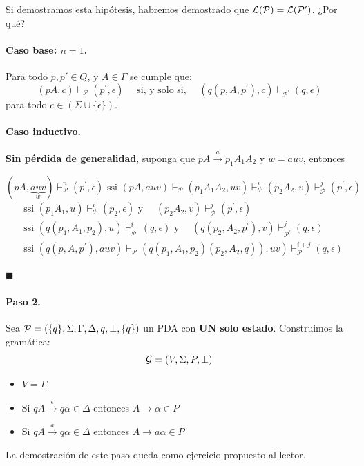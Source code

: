 Si demostramos esta hipótesis, habremos demostrado que $\mathcal{L}(\mathcal{P}) = \mathcal{L}(\mathcal{P'})$. ¿Por qué?

\paragraph{Caso base: $n=1$.} Para todo $p,p' \in Q$, y $A \in \Gamma$ se cumple que:
$$
    (p A, c) \vdash_\mathcal{P}\left(p^{\prime}, \epsilon\right) \quad \text { si, y solo si, } \quad\left(q\left(p, A, p^{\prime}\right), c\right) \vdash_{\mathcal{P}^{\prime}}(q, \epsilon)
$$
para todo $c \in (\Sigma \cup \{\epsilon\})$.

\paragraph{Caso inductivo.} \textbf{Sin pérdida de generalidad}, suponga que $pA \overset{a}{\to} p_1A_1A_2$ y $w=auv$, entonces

$$
    (p A, \underbrace{a u v}_w) \vdash_{\mathcal{P}}^n\left(p^{\prime}, \epsilon\right) \text { ssi }(p A, a u v) \vdash_{\mathcal{P}}\left(p_1 A_1 A_2, u v\right) \vdash_{\mathcal{P}}^i\left(p_2 A_2, v\right) \vdash_{\mathcal{P}}^j\left(p^{\prime}, \epsilon\right)
$$
\begin{align*}
     & \text{ssi }  \left(p_1 A_1, u\right) \vdash_{\mathcal{P}}^i\left(p_2, \epsilon\right) \text { y } \quad\left(p_2 A_2, v\right) \vdash_{\mathcal{P}}^j\left(p^{\prime}, \epsilon\right)                                  \\
     & \text {ssi }  \left(q\left(p_1, A_1, p_2\right), u\right) \vdash_{\mathcal{P}^{\prime}}^i(q, \epsilon) \text { y } \quad\left(q\left(p_2, A_2, p^{\prime}\right), v\right) \vdash_{\mathcal{P}^{\prime}}^j(q, \epsilon) \\
     & \text {ssi }  \left.\left(q\left(p, A, p^{\prime}\right), auv\right) \vdash_{\mathcal{P}}\left(q\left(p_1, A_1, p_2\right)\left(p_2, A_2, q\right)\right), u v\right) \vdash_{\mathcal{P}}^{i+j}(q, \epsilon)
\end{align*}

\hfill $\blacksquare$

\paragraph{Paso 2.} Sea $\mathcal{P}=(\{q\},\Sigma,\Gamma,\Delta,q,\bot,\{q\})$ un PDA con \textbf{UN solo estado}. Construimos la gramática:
$$
    \mathcal{G} = (V, \Sigma, P, \bot)
$$
\begin{itemize}
    \item $V=\Gamma$.
    \item Si $qA \overset{\epsilon}{\to} q\alpha \in \Delta$ entonces $A \to \alpha \in P$
    \item Si $qA \overset{a}{\to} q\alpha \in \Delta$ entonces $A \to a\alpha \in P$
\end{itemize}
La demostración de este paso queda como ejercicio propuesto al lector.

